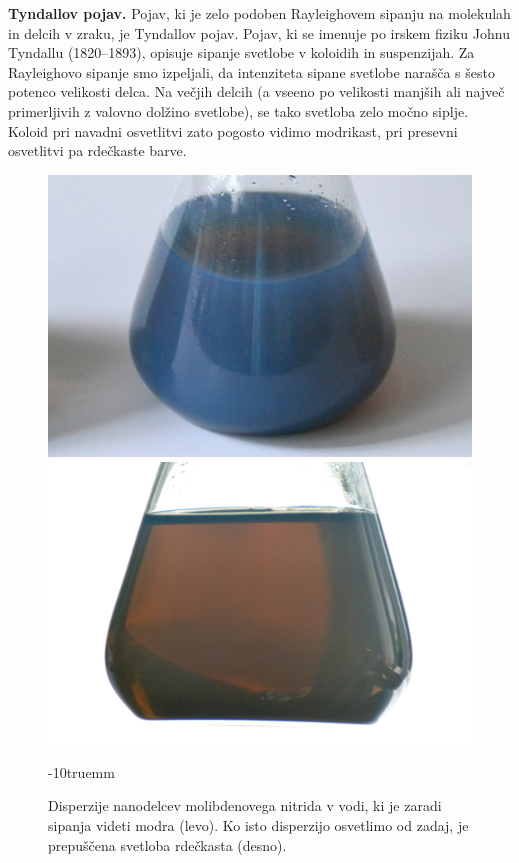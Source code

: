 \begin{example}{\bf Tyndallov pojav.} Pojav, ki je zelo podoben Rayleighovem sipanju
na molekulah in delcih v zraku, je Tyndallov pojav. Pojav, ki se imenuje po irskem fiziku
Johnu Tyndallu (1820--1893), opisuje sipanje svetlobe v koloidih in suspenzijah. Za Rayleighovo
sipanje smo izpeljali, da intenziteta sipane svetlobe narašča s šesto potenco velikosti
delca. Na večjih delcih (a vseeno po velikosti manjših ali največ primerljivih z valovno dolžino 
svetlobe), se tako svetloba zelo močno siplje. Koloid pri navadni 
osvetlitvi zato pogosto vidimo modrikast, pri presevni osvetlitvi pa rdečkaste barve.
\begin{figure}[!h]
\centering
\includegraphics[width=7truecm]{slike/07_Mo2N1.jpg}\hfill
\includegraphics[width=7truecm]{slike/07_Mo2N2.jpg}
\caption{Disperzije nanodelcev molibdenovega nitrida v vodi, ki je zaradi sipanja
videti modra (levo). Ko isto disperzijo osvetlimo od zadaj, je prepuščena svetloba rdečkasta
(desno).}
\label{fig:07_NeboPol}
\vglue-10truemm
\end{figure}

\end{example}


